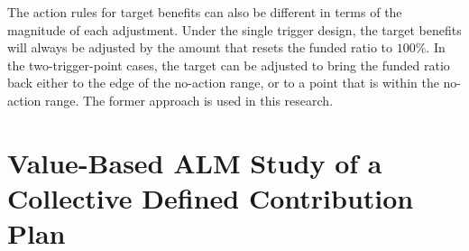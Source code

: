 \documentclass{sfuthesis}
\numberwithin{equation}{chapter}
\begin{document}
		\justify
		The action rules for target benefits can also be different in terms of the magnitude of each adjustment. Under the single trigger design, the target benefits will always be adjusted by the amount that resets the funded ratio to $100\%$. In the two-trigger-point cases, the target can be adjusted to bring the funded ratio back either to the edge of the no-action range, or to a point that is within the no-action range. The former approach is used in this research. 
	
	
	\chapter{Value-Based ALM Study of a Collective Defined Contribution Plan}
	\label{Value-Based ALM Study of a Collective Defined Contribution Plan}



	
\end{document}
